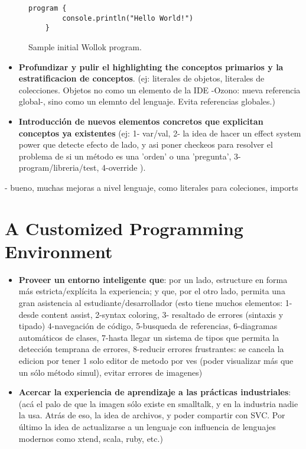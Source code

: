 \begin{figure}[h]
 \centering
 \begin{lstlisting}[language=Wollok]
	program {
		console.println("Hello World!")
	}
 \end{lstlisting}
 
 \caption{\small Sample initial Wollok program.}
 \label{fig:helloWorld/wollok}
\end{figure}

\begin{itemize}
\item \textbf{Profundizar y pulir el highlighting the conceptos primarios y la
estratificacion de conceptos}.
	(ej: literales de objetos, literales de colecciones. Objetos no como un
	elemento de la IDE -Ozono: nueva referencia global-, sino como un elemnto del
	lenguaje. Evita referencias globales.)
\item \textbf{Introducción de nuevos elementos concretos que explicitan
conceptos ya existentes} (ej: 1- var/val, 2- la idea de hacer un effect system
power que detecte efecto de lado, y asi poner checkeos para resolver el problema de si un método es una 'orden' o una 'pregunta', 3- program/libreria/test, 4-override ).
\end{itemize}

- bueno, muchas mejoras a nivel lenguaje, como literales para coleciones, imports


\section{A Customized Programming Environment}
\label{sec:environment}

\begin{itemize}
\item \textbf{Proveer un entorno inteligente que}: por un lado, estructure en
forma más estricta/explícita la experiencia; y que, por el otro lado, permita una gran asistencia al estudiante/desarrollador (esto tiene muchos elementos: 1- desde content assist, 2-syntax coloring, 3- resaltado de errores (sintaxis y tipado) 4-navegación de código, 5-busqueda de referencias, 6-diagramas automáticos de clases, 7-hasta llegar un sistema de tipos que permita la detección temprana de errores, 8-reducir errores frustrantes: se cancela la edicion por tener 1 solo editor de metodo por ves (poder visualizar más que un sólo método simul), evitar errores de imagenes)
\item \textbf{Acercar la experiencia de aprendizaje a las prácticas
industriales}: (acá el palo de que la imagen sólo existe en smalltalk, y en la
industria nadie la usa. Atrás de eso, la idea de archivos, y poder compartir con SVC. Por último la idea de actualizarse a un lenguaje con influencia de lenguajes modernos como xtend, scala, ruby, etc.)
\end{itemize}


